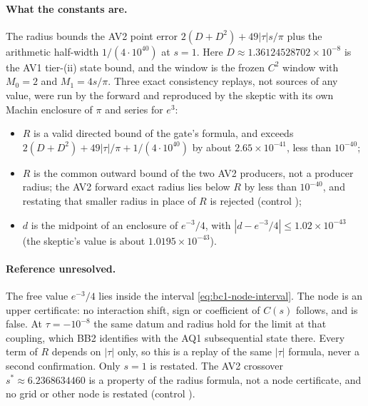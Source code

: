 \paragraph{What the constants are.} The radius bounds the AV2 point error
$2(D+D^2)+49|\tau|s/\pi$ plus the arithmetic half-width $1/(4\cdot10^{40})$
at $s=1$. Here $D\approx1.36124528702\times10^{-8}$ is the AV1 tier-(ii)
state bound, and the window is the frozen $C^2$ window with $M_0=2$ and
$M_1=4s/\pi$. Three exact consistency replays, not sources of any value, were
run by the forward and reproduced by the skeptic with its own Machin
enclosure of $\pi$ and series for $e^3$:
\begin{itemize}
\item $R$ is a valid directed bound of the gate's formula, and exceeds
 $2(D+D^2)+49|\tau|/\pi+1/(4\cdot10^{40})$ by about $2.65\times10^{-41}$,
 less than $10^{-40}$;
\item $R$ is the common outward bound of the two AV2 producers, not a producer
 radius; the AV2 forward exact radius lies below $R$ by less than $10^{-40}$,
 and restating that smaller radius in place of $R$ is rejected
 (control );
\item $d$ is the midpoint of an enclosure of $e^{-3}/4$, with
 $|d-e^{-3}/4|\le1.02\times10^{-43}$ (the skeptic's value is about
 $1.0195\times10^{-43}$).
\end{itemize}

\paragraph{Reference unresolved.} The free value $e^{-3}/4$ lies inside the
interval \eqref{eq:bc1-node-interval}. The node is an upper certificate: no
interaction shift, sign or coefficient of $C(s)$ follows, and
 is false. At $\tau=-10^{-8}$ the same
datum and radius hold for the limit at that coupling, which BB2 identifies
with the AQ1 subsequential state there. Every term of $R$ depends on
$|\tau|$ only, so this is a replay of the same $|\tau|$ formula, never a
second confirmation. Only $s=1$ is restated. The AV2 crossover
$s^*\approx6.2368634460$ is a property of the radius formula, not a node
certificate, and no grid or other node is restated
(control ).

